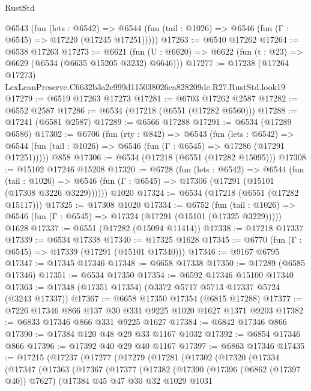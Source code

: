 \begin{lexlean}{RustStd}
\begin{coremodule}
    @6543
      (fun (lets : @6542) =>
      @6544 (fun (tail : @1026) => @6546 (fun (Γ : @6545) => @17220 (@17245 @17251)))))
@17263 := @6540 @17262
@17264 := @6538 @17263
@17273 := @6621
    (fun (U : @6620) => @6622 (fun (t : @23) => @6629 (@6534 (@6635 @15205 @3232) @6646)))
@17277 := @17238
    (@17264 @17273)
    LexLeanPreserve.C6632b3a2e999d115038026ca828209de.R27.RustStd.look19
@17279 := @6519 @17263 @17273
@17281 := @6703 @17262 @2587
@17282 := @6552 @2587
@17286 := @6534 (@17218 (@6551 (@17282 @6560)))
@17288 := @17241 (@6581 @2587)
@17289 := @6566 @17288
@17291 := @6534 (@17289 @6586)
@17302 := @6706
    (fun (rty : @842) =>
    @6543
      (fun (lets : @6542) =>
      @6544 (fun (tail : @1026) => @6546 (fun (Γ : @6545) => @17286 (@17291 @17251)))))
    @858
@17306 := @6534 (@17218 (@6551 (@17282 @15095)))
@17308 := @15102 @17246 @15208
@17320 := @6728
    (fun (lets : @6542) =>
    @6544
      (fun (tail : @1026) =>
      @6546 (fun (Γ : @6545) => @17306 (@17291 (@15101 (@17308 @3226 @3229))))))
    @1020
@17324 := @6534 (@17218 (@6551 (@17282 @15117)))
@17325 := @17308 @1020
@17334 := @6752
    (fun (tail : @1026) => @6546 (fun (Γ : @6545) => @17324 (@17291 (@15101 (@17325 @3229)))))
    @1628
@17337 := @6551 (@17282 (@15094 @11414))
@17338 := @17218 @17337
@17339 := @6534 @17338
@17340 := @17325 @1628
@17345 := @6770 (fun (Γ : @6545) => @17339 (@17291 (@15101 @17340)))
@17346 := @9167 @6795
@17347 := @17345 @17346
@17348 := @6658 @17338
@17350 := @17289 (@6585 @17346)
@17351 := @6534 @17350
@17354 := @6592 @17346 @15100 @17340
@17363 := @17348 (@17351 @17354) (@3372 @5717 @5713 @17337 @5724 (@3243 @17337))
@17367 := @6658 @17350 @17354 (@6815 @17288)
@17377 := @7226 @17346 @866 @137 @30 @331 @9225 @1020 @1627 @1371 @9203
@17382 := @6833 @17346 @866 @331 @9225 @1627
@17384 := @6842 @17346 @866
@17390 := @17384 @120 @48 @29 @33 @1167 @1032
@17392 := @6854 @17346 @866
@17396 := @17392 @40 @29 @40 @1167
@17397 := @6863 @17346
@17435 := @17215
    (@17237
      (@17277
        (@17279
          (@17281
            (@17302
              (@17320
                (@17334
                  (@17347
                    (@17363
                      (@17367
                        (@17377
                          (@17382
                            (@17390
                              (@17396 (@6862 (@17397 @40)) @7627)
                              (@17384
                                @45
                                @47
                                @30
                                @32
                                @1029
                                @1031

\end{coremodule}
\end{lexlean}
